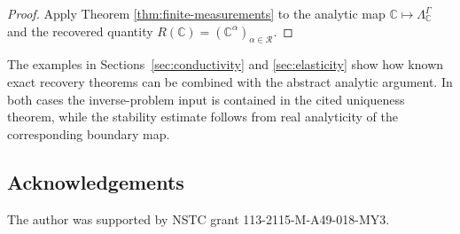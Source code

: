\documentclass[12pt,oneside]{amsart}
\newcommand{\cR}{\mathcal R}
\begin{document}
\begin{proof}
Apply Theorem \ref{thm:finite-measurements} to the analytic map $\mathbb C\mapsto\Lambda_{\mathbb C}^\Gamma$ and the recovered quantity $R(\mathbb C)=(\mathbb C^\alpha)_{\alpha\in\cR}$.
\end{proof}


The examples in Sections~\ref{sec:conductivity} and \ref{sec:elasticity} show how
known exact recovery theorems can be combined with the abstract analytic
argument.  In both cases the inverse-problem input is contained in the cited
uniqueness theorem, while the stability estimate follows from real analyticity
of the corresponding boundary map.

\subsection*{Acknowledgements}
The author was supported by NSTC grant 113-2115-M-A49-018-MY3.



\end{document}
